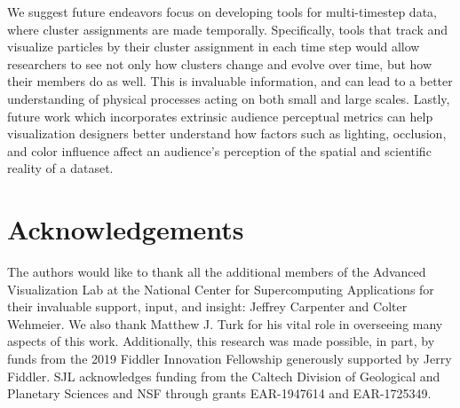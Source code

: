 \documentclass[fleqn,usenatbib,useAMS]{mnras}
\begin{document}
We suggest future endeavors focus on developing tools for multi-timestep data, where cluster assignments are made temporally. Specifically, tools that track and visualize particles by their cluster assignment in each time step would allow researchers to see not only how clusters change and evolve over time, but how their members do as well. This is invaluable information, and can lead to a better understanding of physical processes acting on both small and large scales. Lastly, future work which incorporates extrinsic audience perceptual metrics can help visualization designers better understand how factors such as lighting, occlusion, and color influence affect an audience's perception of the spatial and scientific reality of a dataset. \par

\section*{Acknowledgements}

The authors would like to thank all the additional members of the Advanced Visualization Lab at the National Center for Supercomputing Applications for their invaluable support, input, and insight: Jeffrey Carpenter and Colter Wehmeier. We also thank Matthew J. Turk for his vital role in overseeing many aspects of this work. Additionally, this research was made possible, in part, by funds from the 2019 Fiddler Innovation Fellowship generously supported by Jerry Fiddler. SJL acknowledges funding from the Caltech Division of Geological and Planetary Sciences and NSF through grants EAR-1947614 and EAR-1725349.







\end{document}
